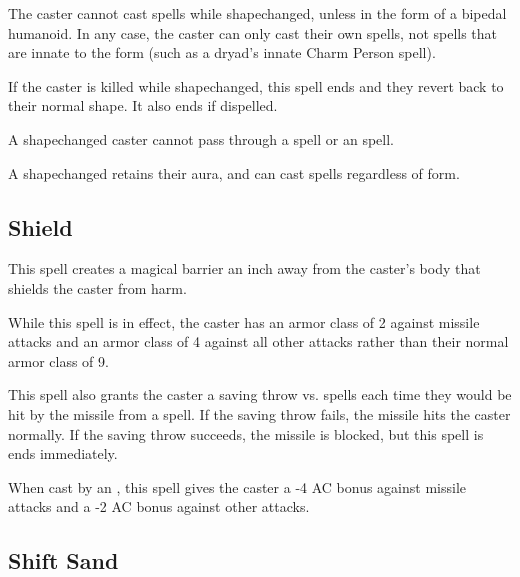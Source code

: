 \begin{multicols*}{2}
The caster cannot cast spells while shapechanged, unless in the form of a bipedal humanoid. In any case, the caster can only cast their own spells, not spells that are innate to the form (such as a dryad’s innate Charm Person spell).

If the caster is killed while shapechanged, this spell ends and they revert back to their normal shape. It also ends if dispelled.

A shapechanged caster cannot pass through a  spell or an  spell.

A shapechanged  retains their aura, and can cast spells regardless of form.

\subsection{Shield}\label{spell:Shield}

This spell creates a magical barrier an inch away from the caster’s body that shields the caster from harm.

While this spell is in effect, the caster has an armor class of 2 against missile attacks and an armor class of 4 against all other attacks rather than their normal armor class of 9.

This spell also grants the caster a saving throw vs. spells each time they would be hit by the missile from a  spell. If the saving throw fails, the missile hits the caster normally. If the saving throw succeeds, the missile is blocked, but this spell is ends immediately.

When cast by an , this spell gives the caster a -4 AC bonus against missile attacks and a -2 AC bonus against other attacks.

\subsection{Shift Sand}\label{spell:Shift Sand}
\end{multicols*}
